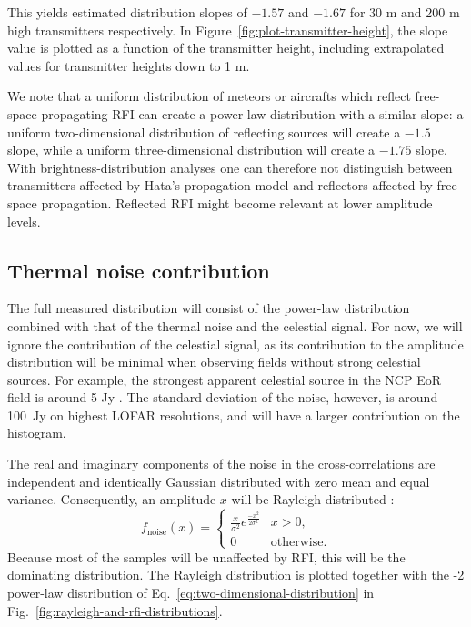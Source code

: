 \documentclass[useAMS,usenatbib]{mn2e}
\begin{document}
This yields estimated distribution slopes of $-1.57$ and $-1.67$ for $30$ m and $200$ m high transmitters respectively. In Figure~\ref{fig:plot-transmitter-height}, the slope value is plotted as a function of the transmitter height, including extrapolated values for transmitter heights down to 1 m.

We note that a uniform distribution of meteors or aircrafts which reflect free-space propagating RFI can create a power-law distribution with a similar slope: a uniform two-dimensional distribution of reflecting sources will create a $-1.5$ slope, while a uniform three-dimensional distribution will create a $-1.75$ slope. With brightness-distribution analyses one can therefore not distinguish between transmitters affected by Hata's propagation model and reflectors affected by free-space propagation. Reflected RFI might become relevant at lower amplitude levels.

\subsection{Thermal noise contribution} \label{sec:histogram-noise}
The full measured distribution will consist of the power-law distribution combined with that of the thermal noise and the celestial signal. For now, we will ignore the contribution of the celestial signal, as its contribution to the amplitude distribution will be minimal when observing fields without strong celestial sources. For example, the strongest apparent celestial source in the NCP EoR field is around 5 Jy \citep{ncp-eor-yatawatta}.
The standard deviation of the noise, however, is around 100~Jy on highest LOFAR resolutions, and will have a larger contribution on the histogram.

The real and imaginary components of the noise in the cross-correlations are independent and identically Gaussian distributed with zero mean and equal variance. Consequently, an amplitude $x$ will be Rayleigh distributed \citep[\S6-2]{papoulis-stochastic-processes}: 
\begin{equation}\label{eq:rayleigh-formula}
f_\textrm{noise}(x) =
\begin{cases}
\frac{x}{\sigma^2} e^{\frac{-x^2}{2\sigma^2}} & x > 0, \\
0 & \textrm{otherwise.}
\end{cases}
\end{equation}
Because most of the samples will be unaffected by RFI, this will be the dominating distribution. The Rayleigh distribution is plotted together with the -2 power-law distribution of Eq.~\eqref{eq:two-dimensional-distribution} in Fig.~\ref{fig:rayleigh-and-rfi-distributions}.
\end{document}
